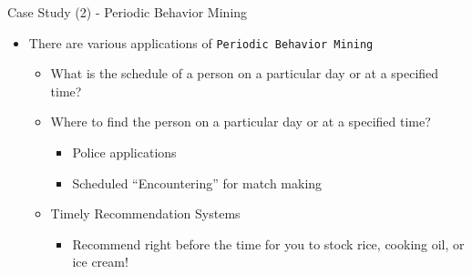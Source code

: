 \documentclass[
 size=14pt,
 paper=smartboard,  %
 mode=present, 		%
 display=slides, 	%
 style=tuliplab,  	%
 pauseslide,
 fleqn,leqno]{powerdot}{}
\begin{document}
\begin{slide}[toc=,bm=]{Case Study (2) - Periodic Behavior Mining}

\begin{itemize}
\item
There are various applications of \texttt{Periodic Behavior Mining}

    \begin{itemize}
    \item
    What is the schedule of a person on a particular day or at a specified time?

    \item
    Where to find the person on a particular day or at a specified time?
        \begin{itemize}
        \item
        Police applications

        \item
        Scheduled ``Encountering'' for match making
        \end{itemize}
    \item
    Timely Recommendation Systems
        \begin{itemize}
        \item
        Recommend right before  the time for you to stock rice, cooking oil, or ice cream!
        \end{itemize}

\end{itemize}
\end{itemize}

\end{slide}


%
%
%
%
\end{document}
